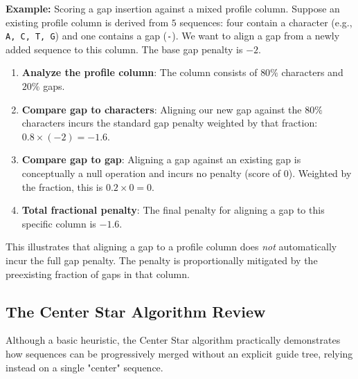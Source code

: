 \textbf{Example:}
Scoring a gap insertion against a mixed profile column.
Suppose an existing profile column is derived from $5$ sequences: four contain a character (e.g., \texttt{A, C, T, G}) and one contains a gap (\texttt{-}). We want to align a gap from a newly added sequence to this column. The base gap penalty is $-2$.
\begin{enumerate}
  \item \textbf{Analyze the profile column}: The column consists of $80\%$ characters and $20\%$ gaps.
  \item \textbf{Compare gap to characters}: Aligning our new gap against the $80\%$ characters incurs the standard gap penalty weighted by that fraction: $0.8 \times (-2) = -1.6$.
  \item \textbf{Compare gap to gap}: Aligning a gap against an existing gap is conceptually a null operation and incurs no penalty (score of $0$). Weighted by the fraction, this is $0.2 \times 0 = 0$.
  \item \textbf{Total fractional penalty}: The final penalty for aligning a gap to this specific column is $-1.6$.
\end{enumerate}
This illustrates that aligning a gap to a profile column does \textit{not} automatically incur the full gap penalty. The penalty is proportionally mitigated by the preexisting fraction of gaps in that column.

\subsection{The Center Star Algorithm Review}
Although a basic heuristic, the Center Star algorithm practically demonstrates how sequences can be progressively merged without an explicit guide tree, relying instead on a single "center" sequence.

